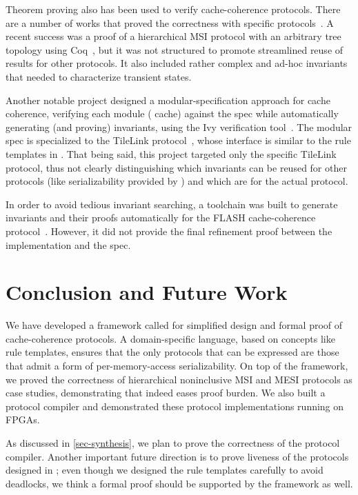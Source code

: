 \documentclass[sigplan,10pt,review,anonymous,screen]{acmart}\settopmatter{printfolios=true,printccs=false,printacmref=false}
\begin{document}
Theorem proving also has been used to verify cache-coherence protocols.
There are a number of works that proved the correctness with specific protocols~\cite{Park:1996,Moore:1998}.
A recent success was a proof of a hierarchical MSI protocol with an arbitrary tree topology using Coq~\cite{Murali:2015}, but it was not structured to promote streamlined reuse of results for other protocols.
It also included rather complex and ad-hoc invariants that needed to characterize transient states.

Another notable project designed a modular-specification approach for cache coherence, verifying each module (\ie{} cache) against the spec while automatically generating (and proving) invariants, using the Ivy verification tool~\cite{ivy:Padon:2016, McMillan:2016, ivy:McMillan:2020}.
The modular spec is specialized to the TileLink protocol~\cite{tilelink}, whose interface is similar to the rule templates in \hemiola{}.
That being said, this project targeted only the specific TileLink protocol, thus not clearly distinguishing which invariants can be reused for other protocols (like serializability provided by \hemiola{}) and which are for the actual protocol.

In order to avoid tedious invariant searching, a toolchain was built to generate invariants and their proofs automatically for the FLASH cache-coherence protocol~\cite{Li:2018}.
However, it did not provide the final refinement proof between the implementation and the spec.

\section{Conclusion and Future Work}
\label{sec-conclusion}

We have developed a framework called \hemiola{} for simplified design and formal proof of cache-coherence protocols.
A domain-specific language, based on concepts like rule templates, ensures that the only protocols that can be expressed are those that admit a form of per-memory-access serializability.
On top of the framework, we proved the correctness of hierarchical noninclusive MSI and MESI protocols as case studies, demonstrating that \hemiola{} indeed eases proof burden.
We also built a protocol compiler and demonstrated these protocol implementations running on FPGAs.

As discussed in \autoref{sec-synthesis}, we plan to prove the correctness of the protocol compiler.
Another important future direction is to prove liveness of the protocols designed in \hemiola{}; even though we designed the rule templates carefully to avoid deadlocks, we think a formal proof should be supported by the framework as well.
\end{document}
